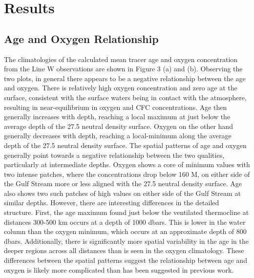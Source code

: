 \section{Results}
\subsection{Age and Oxygen Relationship}

The climatologies of the calculated mean tracer age and oxygen concentration from the Line W observations are shown in Figure 3 (a) and (b). Observing the two plots, in general there appears to be a negative relationship between the age and oxygen. There is relatively high oxygen concentration and zero age at the surface, consistent with the surface waters being in contact with the atmosphere, resulting in near-equilibrium in oxygen and CFC concentrations. Age then generally increases with depth, reaching a local maximum at just below the average depth of the 27.5 neutral density surface. Oxygen on the other hand generally decreases with depth, reaching a local-minimum along the average depth of the 27.5 neutral density surface. The spatial patterns of age and oxygen generally point towards a negative relationship between the two qualities, particularly at intermediate depths. Oxygen shows a core of minimum values with two intense patches, where the concentrations drop below 160  M, on either side of the Gulf Stream more or less aligned with the 27.5 neutral density surface. Age also shows two such patches of high values on either side of the Gulf Stream at similar depths. However, there are interesting differences in the detailed structure. First, the age maximum found just below the ventilated thermocline at distances 300-500 km occurs at a depth of 1000 dbars. This is lower in the water column than the oxygen minimum, which occurs at an approximate depth of 800 dbars. Additionally, there is significantly more spatial variability in the age in the deeper regions across all distances than is seen in the oxygen climatology. These differences between the spatial patterns suggest the relationship between age and oxygen is likely more complicated than has been suggested in previous work.

